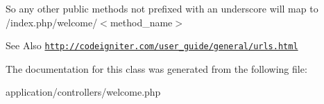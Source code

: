 So any other public methods not prefixed with an underscore will map to /index.php/welcome/$<$method\-\_\-name$>$ \begin{DoxySeeAlso}{See Also}
\href{http://codeigniter.com/user_guide/general/urls.html}{\tt http\-://codeigniter.\-com/user\-\_\-guide/general/urls.\-html} 
\end{DoxySeeAlso}


The documentation for this class was generated from the following file\-:\begin{DoxyCompactItemize}
\item 
application/controllers/welcome.\-php\end{DoxyCompactItemize}
